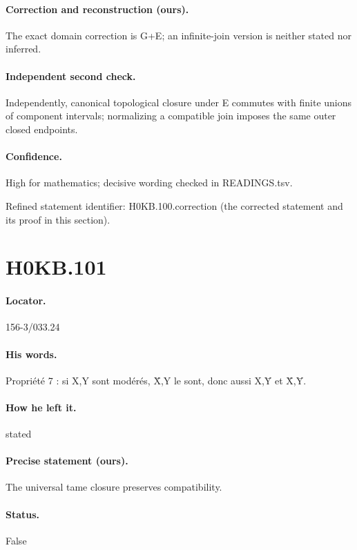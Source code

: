 \paragraph{Correction and reconstruction (ours).} The exact domain correction is G+E; an infinite-join version is neither stated nor inferred.

\paragraph{Independent second check.} Independently, canonical topological closure under E commutes with finite unions of component intervals; normalizing a compatible join imposes the same outer closed endpoints.

\paragraph{Confidence.} High for mathematics; decisive wording checked in READINGS.tsv.

\noindent Refined statement identifier: H0KB.100.correction (the corrected statement and its proof in this section).

\section*{H0KB.101}\label{statement:H0KB.101}
\paragraph{Locator.} 156-3/033.24

\paragraph{His words.} Propriété 7 : si X,Y sont modérés, X̄,Y le sont, donc aussi X,Ȳ et X̄,Ȳ.

\paragraph{How he left it.} stated

\paragraph{Precise statement (ours).} The universal tame closure preserves compatibility.

\paragraph{Status.} False

